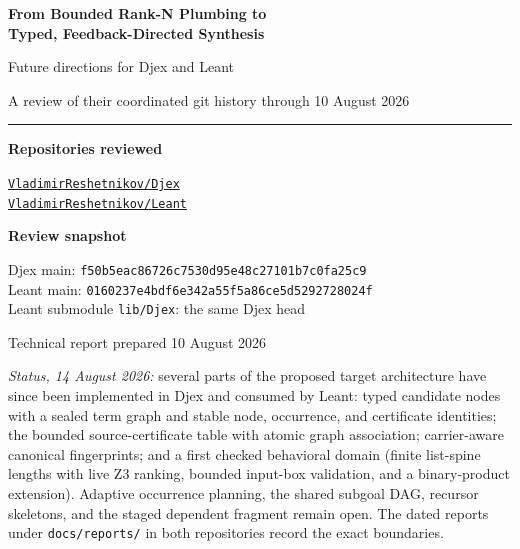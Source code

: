 \documentclass[11pt]{article}
\newcommand{\code}[1]{\texttt{#1}}
\newcommand{\Djex}{\textsf{Djex}}
\newcommand{\Leant}{\textsf{Leant}}
\newcommand{\RepoDjex}{\href{https://github.com/VladimirReshetnikov/Djex}{\code{VladimirReshetnikov/Djex}}}
\newcommand{\RepoLeant}{\href{https://github.com/VladimirReshetnikov/Leant}{\code{VladimirReshetnikov/Leant}}}
\newcommand{\headsha}[1]{\code{#1}}
\begin{document}
\hypersetup{pageanchor=false}

\begin{titlepage}
  \centering
  \vspace*{1.5cm}
  {\sffamily\bfseries\fontsize{25}{31}\selectfont
   From Bounded Rank-N Plumbing to\\[0.2em]
   Typed, Feedback-Directed Synthesis\par}
  \vspace{0.9cm}
  {\sffamily\Large Future directions for \Djex{} and \Leant{}\par}
  \vspace{0.45cm}
  {\sffamily\large A review of their coordinated git history through 10 August 2026\par}
  \vspace{1.5cm}
  \rule{0.78\textwidth}{0.55pt}
  \vspace{1.2cm}

  \begin{minipage}{0.83\textwidth}
  \large
  \textbf{Repositories reviewed}\par
  \vspace{0.25cm}
  \RepoDjex\\
  \RepoLeant

  \vspace{0.75cm}
  \textbf{Review snapshot}\par
  \vspace{0.25cm}
  \Djex{} main: \headsha{f50b5eac86726c7530d95e48c27101b7c0fa25c9}\\
  \Leant{} main: \headsha{0160237e4bdf6e342a55f5a86ce5d5292728024f}\\
  \Leant{} submodule \code{lib/Djex}: the same \Djex{} head
  \end{minipage}

  \vfill
  {\sffamily\small Technical report prepared 10 August 2026\par}
  \vspace{3mm}
  {\small\color{Muted}
  \emph{Status, 14 August 2026:} several parts of the proposed target
  architecture have since been implemented in \Djex{} and consumed by
  \Leant{}: typed candidate nodes with a sealed term graph and stable node,
  occurrence, and certificate identities; the bounded source-certificate
  table with atomic graph association; carrier-aware canonical fingerprints;
  and a first checked behavioral domain (finite list-spine lengths with live
  Z3 ranking, bounded input-box validation, and a binary-product extension).
  Adaptive occurrence planning, the shared subgoal DAG, recursor skeletons,
  and the staged dependent fragment remain open.  The dated reports under
  \code{docs/reports/} in both repositories record the exact boundaries.

}
\end{titlepage}
\end{document}
